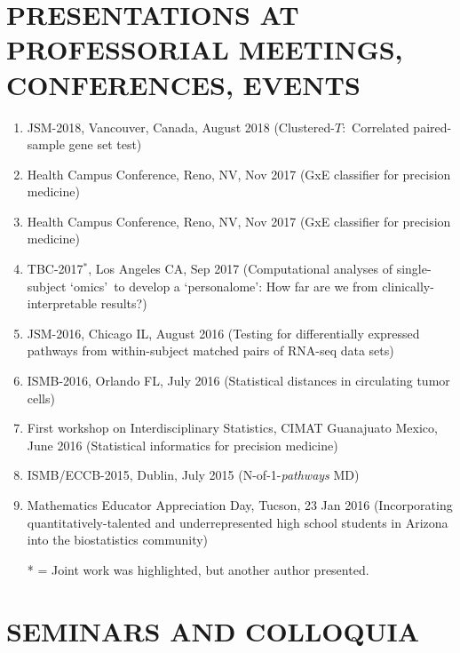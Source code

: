\documentclass[paper=a4,fontsize=11pt]{scrartcl} %
\newcommand{\NewPart}[2]{\section*{\uppercase{#1} #2 }}
\newcommand{\TalkEntry}[4]{
		\noindent #1, #2, #3 #4}
\begin{document}
\NewPart{Presentations at professorial meetings, conferences, events}{}
\vspace{-7pt}
\begin{enumerate}

\item\TalkEntry{JSM-2018}{Vancouver, Canada}{August 2018}{(Clustered-$T$:~Correlated paired-sample gene set test)}
  
\item\TalkEntry{Health Campus Conference}{Reno, NV}{Nov 2017}{(GxE classifier for precision medicine)}
  
\item\TalkEntry{Health Campus Conference}{Reno, NV}{Nov 2017}{(GxE classifier for precision medicine)}
  
  \item\TalkEntry{TBC-2017$^{*}$}{Los Angeles CA}{Sep 2017}{(Computational analyses of single-subject \lq omics\rq~to develop a \lq personalome\rq: How far are we from clinically-interpretable results?)}

\item\TalkEntry{JSM-2016}{Chicago IL}{August 2016}{(Testing for differentially expressed pathways from within-subject matched pairs of RNA-seq data sets)}
\item\TalkEntry{ISMB-2016}{Orlando FL}{July 2016}{(Statistical distances in circulating tumor cells)}
\item\TalkEntry{First workshop on Interdisciplinary Statistics}{CIMAT Guanajuato Mexico}{June 2016}{(Statistical informatics for precision medicine)} 
\item\TalkEntry{ISMB/ECCB-2015}{Dublin}{July 2015}{(N-of-1-\textit{pathways} MD)} 
\item\TalkEntry{2016 Mathematics Educator Appreciation Day}{Tucson}{23 Jan 2016}{(Incorporating quantitatively-talented and underrepresented high school students in Arizona into the biostatistics community)} 
\vspace{-7pt}

* = Joint work was highlighted, but another author presented.
\end{enumerate}

\NewPart{Seminars and Colloquia}{}
\end{document}

